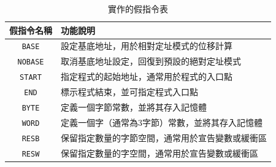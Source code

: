 \begin{table}[hbtp]
    \centering
    \caption{實作的假指令表}
    \label{tab:directives}
    \begin{tabular}{|c|l|}
        \hline
        假指令名稱              & 功能說明                     \\
        \hline
        \lstinline{BASE}   & 設定基底地址，用於相對定址模式的位移計算     \\
        \lstinline{NOBASE} & 取消基底地址設定，回復到預設的絕對定址模式    \\
        \lstinline{START}  & 指定程式的起始地址，通常用於程式的入口點     \\
        \lstinline{END}    & 標示程式結束，並可指定程式入口點         \\
        \lstinline{BYTE}   & 定義一個字節常數，並將其存入記憶體        \\
        \lstinline{WORD}   & 定義一個字（通常為3字節）常數，並將其存入記憶體 \\
        \lstinline{RESB}   & 保留指定數量的字節空間，通常用於宣告變數或緩衝區 \\
        \lstinline{RESW}   & 保留指定數量的字空間，通常用於宣告變數或緩衝區  \\
        \hline
    \end{tabular}
\end{table}
